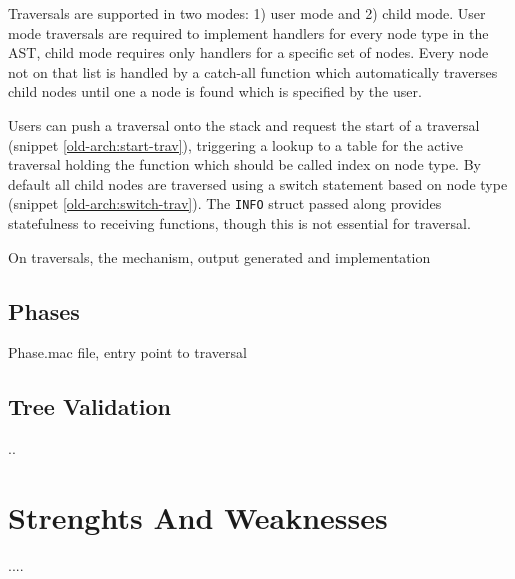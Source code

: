 \documentclass[twoside,openright]{uva-bachelor-thesis}
\newcommand{\code}[1]{\texttt{\footnotesize#1}}
\begin{document}
			Traversals are supported in two modes: 1) user mode and 2) child mode. User mode traversals are required to implement handlers for every node type in the AST, child mode requires only handlers for a specific set of nodes. Every node not on that list is  handled by a catch-all function which automatically traverses child nodes until one a node is found which is specified by the user.
			
			Users can push a traversal onto the stack and request the start of a traversal (snippet \ref{old-arch:start-trav}), triggering a lookup to a table for the active traversal holding the function which should be called index on node type. By default all child nodes are traversed using a switch statement based on node type (snippet \ref{old-arch:switch-trav}). The \code{INFO} struct passed along provides statefulness to receiving functions, though this is not essential for traversal.
			
			On traversals, the mechanism, output generated and implementation
		
		\subsection{Phases}
			Phase.mac file, entry point to traversal
		
		\subsection{Tree Validation}
		\label{tree-validation}
			..
		
	
	\section{Strenghts And Weaknesses}
		....
	
		
		
\end{document}
